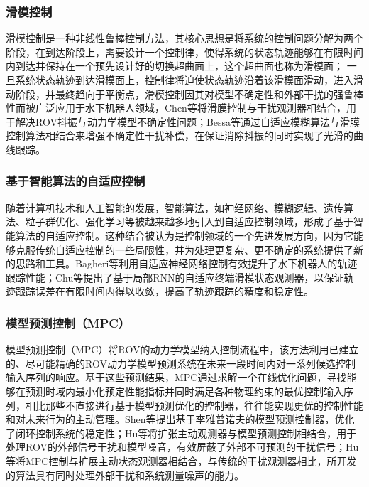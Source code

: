 \subsubsection{滑模控制}

滑模控制是一种非线性鲁棒控制方法，其核心思想是将系统的控制问题分解为两个阶段，在到达阶段上，需要设计一个控制律，使得系统的状态轨迹能够在有限时间内到达并保持在一个预先设计好的切换超曲面上，这个超曲面也称为滑模面； 一旦系统状态轨迹到达滑模面上，控制律将迫使状态轨迹沿着该滑模面滑动，进入滑动阶段，并最终趋向于平衡点，滑模控制因其对模型不确定性和外部干扰的强鲁棒性而被广泛应用于水下机器人领域\cite{renROVSlidingMode2023}，Chen等\cite{chenFunctionbasedRobustSliding2025}将滑膜控制与干扰观测器相结合，用于解决ROV抖振与动力学模型不确定性问题；Bessa等\cite{bessaDepthControlRemotely2008}通过自适应模糊算法与滑膜控制算法相结合来增强不确定性干扰补偿，在保证消除抖振的同时实现了光滑的曲线跟踪。

\subsubsection{基于智能算法的自适应控制}

随着计算机技术和人工智能的发展，智能算法，如神经网络、模糊逻辑、遗传算法、粒子群优化、强化学习等被越来越多地引入到自适应控制领域，形成了基于智能算法的自适应控制。这种结合被认为是控制领域的一个先进发展方向，因为它能够克服传统自适应控制的一些局限性，并为处理更复杂、更不确定的系统提供了新的思路和工具。Bagheri等\cite{bagheriTrackingPerformanceControl2010}利用自适应神经网络控制有效提升了水下机器人的轨迹跟踪性能；Chu等\cite{chuObserverBasedAdaptiveNeural2017}提出了基于局部RNN的自适应终端滑模状态观测器，以保证轨迹跟踪误差在有限时间内得以收敛，提高了轨迹跟踪的精度和稳定性。

\subsubsection{模型预测控制（MPC）}

模型预测控制（MPC）将ROV的动力学模型纳入控制流程中，该方法利用已建立的、尽可能精确的ROV动力学模型预测系统在未来一段时间内对一系列候选控制输入序列的响应。基于这些预测结果，MPC通过求解一个在线优化问题，寻找能够在预测时域内最小化预定性能指标并同时满足各种物理约束的最优控制输入序列，相比那些不直接进行基于模型预测优化的控制器，往往能实现更优的控制性能和对未来行为的主动管理。Shen等\cite{shenTrajectoryTrackingControl2018}提出基于李雅普诺夫的模型预测控制器，优化了闭环控制系统的稳定性；Hu等\cite{huDisturbanceObserverBasedModel2024}将扩张主动观测器与模型预测控制相结合，用于处理ROV的外部信号干扰和模型噪音，有效屏蔽了外部不可预测的干扰信号；Hu等将MPC控制与扩展主动状态观测器相结合，与传统的干扰观测器相比，所开发的算法具有同时处理外部干扰和系统测量噪声的能力。

